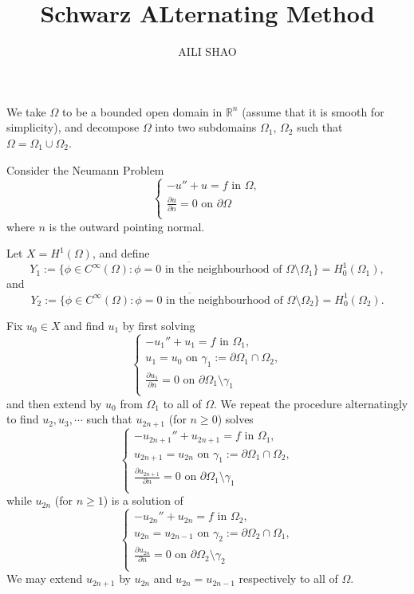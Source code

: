 \documentclass[11pt, a4paper]{amsart}
\begin{document}
\title{Schwarz ALternating Method}
\author{AILI SHAO}
\maketitle
\hrulefill
\hrulefill
\hrulefill

We take $\Omega$ to be a bounded open domain in $\mathbb{R}^n$ (assume that it is smooth for simplicity), and decompose $\Omega$ into two subdomains $\Omega_1$, $\Omega_2$ such that $\Omega=\Omega_1\cup\Omega_2$.

Consider the Neumann Problem
$$\begin{cases}
-u''+u=f  \mbox{ in } \Omega, \\
\frac{\partial u}{\partial n}=0 \mbox{ on } \partial \Omega \\
\end{cases}$$
where $n$ is the outward pointing normal.

Let $X=H^{1}(\Omega)$,
and define 
$$Y_1:=\overline{\{\phi\in C^{\infty}(\Omega):\phi=0 \mbox{ in the neighbourhood of } \Omega\setminus \Omega_1\}}=H_{0}^{1}(\Omega_1),$$ and
$$Y_2:=\overline{\{\phi\in C^{\infty}(\Omega):\phi=0 \mbox{ in the neighbourhood of } \Omega\setminus \Omega_{2}\}}=H_{0}^{1}(\Omega_2).$$

Fix $u_0\in X$ and find $u_1$ by first solving
$$\begin{cases}
-u_1''+u_1=f  \mbox{ in } \Omega_1, \\
u_1=u_0 \mbox{ on } \gamma_1:=\partial\Omega_1\cap\Omega_2 ,\\
\frac{\partial u_1}{\partial n}=0  \mbox{ on }\partial\Omega_1\setminus \gamma_1\\
\end{cases}$$ 
and then extend by $u_0$ from $\Omega_1$ to all of $\Omega$.
We repeat the procedure alternatingly to find $u_2,u_3,\cdots$ such that $u_{2n+1}$ (for $n\geq 0$) solves
$$\begin{cases}
-u_{2n+1}''+u_{2n+1}=f  \mbox{ in } \Omega_1, \\
u_{2n+1}=u_{2n} \mbox{ on } \gamma_1:=\partial\Omega_1\cap\Omega_2 ,\\
\frac{\partial u_{2n+1}}{\partial n}=0  \mbox{ on }\partial\Omega_1\setminus \gamma_1\\
\end{cases}$$ 
while $u_{2n}$ (for $n\geq 1$) is a solution of 
$$\begin{cases}
-u_{2n}''+u_{2n}=f  \mbox{ in } \Omega_2, \\
u_{2n}=u_{2n-1} \mbox{ on } \gamma_2:=\partial\Omega_2\cap\Omega_1 ,\\
\frac{\partial u_{2n}}{\partial n}=0  \mbox{ on }\partial\Omega_2\setminus \gamma_2\\
\end{cases}$$  
We may extend $u_{2n+1}$ by $u_{2n}$ and $u_{2n}=u_{2n-1}$ respectively to all of $\Omega$.
\end{document}
